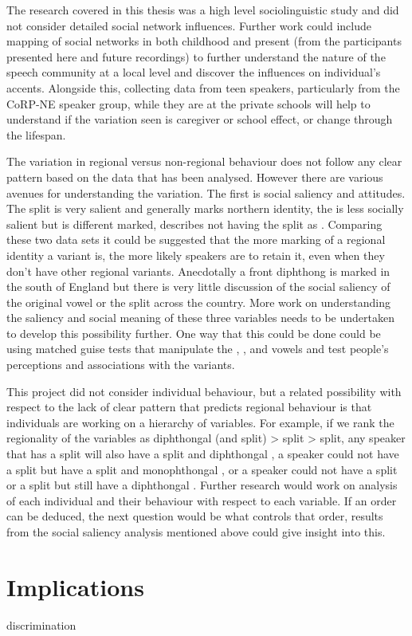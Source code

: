 \documentclass[../../00.FullDoc/tex/ThesisSkeleton-draft2]{subfiles}
\begin{document}
The research covered in this thesis was a high level sociolinguistic study and did not consider detailed social network influences. Further work could include mapping of social networks \citep{Milroy1992} in both childhood and present (from the participants presented here and future recordings) to further understand the nature of the speech community at a local level and discover the influences on individual's accents. Alongside this, collecting data from teen speakers, particularly from the CoRP-NE speaker group, while they are at the private schools will help to understand if the variation seen is caregiver or school effect, or change through the lifespan.

The variation in regional versus non-regional behaviour does not follow any clear pattern based on the data that has been analysed. However there are various avenues for understanding the variation. The first is social saliency and attitudes. The \TB{} split is very salient and generally marks northern identity, the \FS{} is less socially salient but is different marked, \citet{Wells1982b} describes not having the split as . Comparing these two data sets it could be suggested that the more marking of a regional identity a variant is, the more likely speakers are to retain it, even when they don't have other regional variants. Anecdotally a front \goat{} diphthong is marked in the south of England but there is very little discussion of the social saliency of the original vowel or the split across the country. More work on understanding the saliency and social meaning of these three variables needs to be undertaken to develop this possibility further. One way that this could be done could be using matched guise tests that manipulate the \bath{}, \strutt{}, and \goat{} vowels and test people's perceptions and associations with the variants.

This project did not consider individual behaviour, but a related possibility with respect to the lack of clear pattern that predicts regional behaviour is that individuals are working on a hierarchy of variables. For example, if we rank the regionality of the variables as diphthongal \goat{} (and \GG{} split) > \FS{} split > \TB{} split, any speaker that has a \TB{} split will also have a \FS{} split and diphthongal \goat{}, a speaker could not have a \TB{} split but have a \FS{} split and monophthongal \goat{}, or a speaker could not have a \TB{} split or a \FS{} split but still have a diphthongal \goat{}. Further research would work on analysis of each individual and their behaviour with respect to each variable. If an order can be deduced, the next question would be what controls that order, results from the social saliency analysis mentioned above could give insight into this.




\section{Implications}
discrimination

\onlyinsubfile{
	\listoftodos
	\pagebreak
	
}
	
\end{document}
